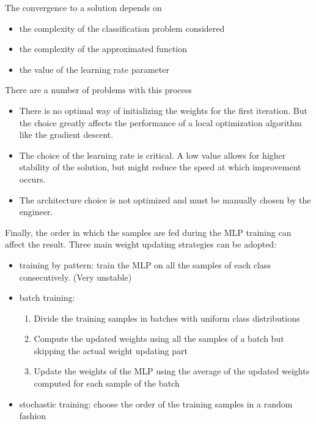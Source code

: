 \documentclass[oneside,onecolumn]{report}
\begin{document}
The convergence to a solution depends on
\begin{itemize}
    \item the complexity of the classification problem considered
    \item the complexity of the approximated function
    \item the value of the learning rate parameter
\end{itemize}

There are a number of problems with this process
\begin{itemize}
    \item There is no optimal way of initializing the weights for the first iteration. But the choice greatly affects the performance of a local optimization algorithm like the gradient descent.

    \item The choice of the learning rate is critical. A low value allows for higher stability of the solution, but might reduce the speed at which improvement occurs.

    \item The architecture choice is not optimized and must be manually chosen by the engineer.
\end{itemize}

Finally, the order in which the samples are fed during the MLP training can affect the result.
Three main weight updating strategies can be adopted:
\begin{itemize}
    \item training by pattern: train the MLP on all the samples of each class consecutively. (Very unstable)

    \item batch training:
    \begin{enumerate}
        \item Divide the training samples in batches with uniform class distributions
        \item Compute the updated weights using all the samples of a batch but skipping the actual weight updating part
        \item Update the weights of the MLP using the average of the updated weights computed for each sample of the batch
    \end{enumerate}

    \item stochastic training: choose the order of the training samples in a random fashion
\end{itemize}
\end{document}
